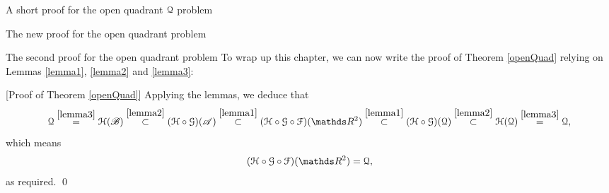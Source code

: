 \documentclass[11pt, a4paper, english, twoside, notitlepage, openright]{report}
\begin{document}
\begin{chapter}{A short proof for the open quadrant $\mathcal{Q}$ problem}
\begin{section}{The new proof for the open quadrant problem}
\begin{subsection}{The second proof for the open quadrant problem}
To wrap up this chapter, we can now write the proof of Theorem \ref{openQuad} relying on Lemmas \ref{lemma1}, \ref{lemma2} and \ref{lemma3}:

\vspace{1mm}

[Proof of Theorem \ref{openQuad}] Applying the lemmas, we deduce that
$$
\Qu \overset{\ref{lemma3}}{=}\HH(\mathscr{B})\overset{\ref{lemma2}}{\subset}(\HH\circ\GG)(\mathscr{A}) \overset{\ref{lemma1}}{\subset}(\HH\circ\GG\circ\FF)(\R^2)\overset{\ref{lemma1}}{\subset}(\HH\circ\GG)(\Qu) \overset{\ref{lemma2}}{\subset}\HH(\Qu)\overset{\ref{lemma3}}{=}\Qu,
$$
which means 
$$
(\HH\circ\GG\circ\FF)(\R^2)=\Qu,
$$
as required.
\qed
\end{subsection}

\end{section}
\end{chapter}
\end{document}
